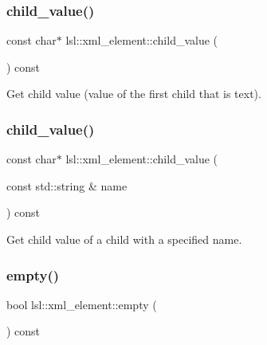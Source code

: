 \subsubsection{\texorpdfstring{child\+\_\+value()}{child\_value()}\hspace{0.1cm}{\footnotesize\ttfamily [1/2]}}
{\footnotesize\ttfamily const char$\ast$ lsl\+::xml\+\_\+element\+::child\+\_\+value (\begin{DoxyParamCaption}{ }\end{DoxyParamCaption}) const\hspace{0.3cm}{\ttfamily [inline]}}



Get child value (value of the first child that is text). 

\mbox{\label{classlsl_1_1xml__element_a893102d2d84a444a89099f9c90cb6c31}} 
\subsubsection{\texorpdfstring{child\+\_\+value()}{child\_value()}\hspace{0.1cm}{\footnotesize\ttfamily [2/2]}}
{\footnotesize\ttfamily const char$\ast$ lsl\+::xml\+\_\+element\+::child\+\_\+value (\begin{DoxyParamCaption}\item[{const std\+::string \&}]{name }\end{DoxyParamCaption}) const\hspace{0.3cm}{\ttfamily [inline]}}



Get child value of a child with a specified name. 

\mbox{\label{classlsl_1_1xml__element_a787dcaf85abcc5cd4d5f93fc80c82eb5}} 
\subsubsection{\texorpdfstring{empty()}{empty()}}
{\footnotesize\ttfamily bool lsl\+::xml\+\_\+element\+::empty (\begin{DoxyParamCaption}{ }\end{DoxyParamCaption}) const\hspace{0.3cm}{\ttfamily [inline]}}



